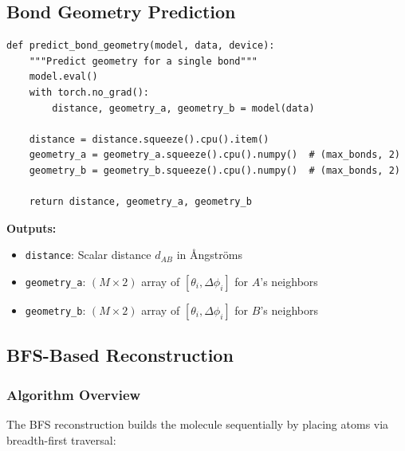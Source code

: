 \documentclass[11pt,a4paper]{article}
\begin{document}
\subsection{Bond Geometry Prediction}

\begin{lstlisting}[caption={Predict Bond Geometry (lines 252-278)}]
def predict_bond_geometry(model, data, device):
    """Predict geometry for a single bond"""
    model.eval()
    with torch.no_grad():
        distance, geometry_a, geometry_b = model(data)

    distance = distance.squeeze().cpu().item()
    geometry_a = geometry_a.squeeze().cpu().numpy()  # (max_bonds, 2)
    geometry_b = geometry_b.squeeze().cpu().numpy()  # (max_bonds, 2)

    return distance, geometry_a, geometry_b
\end{lstlisting}

\textbf{Outputs:}
\begin{itemize}
    \item \texttt{distance}: Scalar distance $d_{AB}$ in Ångströms
    \item \texttt{geometry\_a}: $(M \times 2)$ array of $[\theta_i, \Delta\phi_i]$ for $A$'s neighbors
    \item \texttt{geometry\_b}: $(M \times 2)$ array of $[\theta_i, \Delta\phi_i]$ for $B$'s neighbors
\end{itemize}

\subsection{BFS-Based Reconstruction}

\subsubsection{Algorithm Overview}

The BFS reconstruction builds the molecule sequentially by placing atoms via breadth-first traversal:
\end{document}
